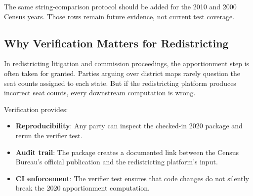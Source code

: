 The same string-comparison protocol should be added for the 2010 and 2000
Census years.  Those rows remain future evidence, not current test coverage.

\subsection{Why Verification Matters for Redistricting}

In redistricting litigation and commission proceedings, the
apportionment step is often taken for granted.
Parties arguing over district maps rarely question the seat counts
assigned to each state.
But if the redistricting platform produces incorrect seat counts,
every downstream computation is wrong.

Verification provides:
\begin{itemize}
  \item \textbf{Reproducibility}: Any party can inspect the checked-in 2020
    package and rerun the verifier test.
  \item \textbf{Audit trail}: The package creates a documented
    link between the Census Bureau's official publication and the
    redistricting platform's input.
  \item \textbf{CI enforcement}: The verifier test ensures that code changes do
    not silently break the 2020 apportionment computation.
\end{itemize}
